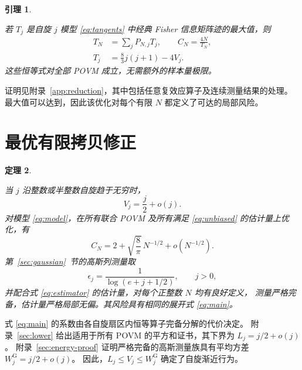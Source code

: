 \documentclass[aps,pra,reprint,superscriptaddress,longbibliography]{revtex4-2}
\newtheorem{theorem}{定理}
\newtheorem{lemma}[theorem]{引理}
\theoremstyle{remark}
\newcommand{\g}{\mathrm G}
\begin{document}
\begin{lemma}\label{lem:reduction}

若 $T_j$ 是自旋 $j$ 模型 \eqref{eq:tangents} 中经典 Fisher 信息矩阵迹的最大值，则
\begin{equation}
\begin{aligned}
T_N&=\sum_jP_{N,j}T_j,\qquad C_N=\frac{4N}{T_N},\\
T_j&=\frac83j(j+1)-4V_j.
\end{aligned}
\label{eq:reductions}
\end{equation}
这些恒等式对全部 POVM 成立，无需额外的样本量极限。

\end{lemma}

证明见附录~\ref{app:reduction}，其中包括任意复效应算子及连续测量结果的处理。
最大值可以达到，因此该优化对每个有限 $N$ 都定义了可达的局部风险。

\section{最优有限拷贝修正}\label{sec:result}

\begin{theorem}\label{thm:main}

当 $j$ 沿整数或半整数自旋趋于无穷时，
\begin{equation}
 V_j=\frac j2+o(j).
 \label{eq:roof-asymptotic}
\end{equation}
对模型 \eqref{eq:model}，在所有联合 POVM 及所有满足 \eqref{eq:unbiased} 的估计量上优化，有
\begin{equation}
 \boxed{\displaystyle
 C_N=2+\sqrt{\frac8\pi}\,N^{-1/2}+o(N^{-1/2}).}
 \label{eq:main}
\end{equation}
第~\ref{sec:gaussian}~节的高斯列测量取
\begin{equation}
 \epsilon_j=\frac1{\log(e+j+1/2)},\qquad j>0,
 \label{eq:epsilon}
\end{equation}
并配合式 \eqref{eq:estimator} 的估计量，对每个正整数 $N$ 均有良好定义，
测量严格完备，估计量严格局部无偏。其风险具有相同的展开式 \eqref{eq:main}。

\end{theorem}

式 \eqref{eq:main} 的系数由各自旋扇区内恒等算子完备分解的代价决定。
附录~\ref{sec:lower} 给出适用于所有 POVM 的平方和证书，其下界为 $L_j=j/2+o(j)$。
附录~\ref{sec:energy-proof} 证明严格完备的高斯测量族具有平均方差 $W_j^{\g}=j/2+o(j)$。
因此，$L_j\leq V_j\leq W_j^{\g}$ 确定了自旋渐近行为。
\end{document}
